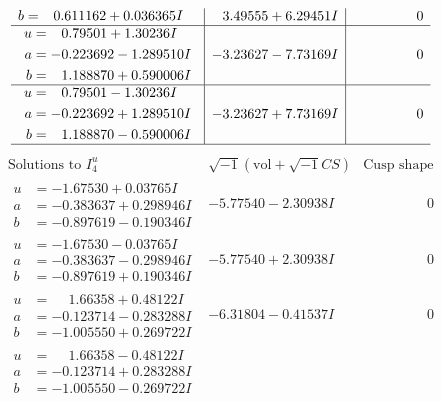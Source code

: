 \documentclass[1p]{elsarticle_modified}
\theoremstyle{definition}
\newcommand{\I}{\sqrt{-1}}
\begin{document}
$$\begin{array}{c|c|c}
\begin{aligned}
b &= \phantom{-}0.611162 + 0.036365 I\end{aligned}
 & \phantom{-}3.49555 + 6.29451 I & \phantom{-0.000000 } 0 \\ \hline\begin{aligned}
u &= \phantom{-}0.79501 + 1.30236 I \\
a &= -0.223692 - 1.289510 I \\
b &= \phantom{-}1.188870 + 0.590006 I\end{aligned}
 & -3.23627 - 7.73169 I & \phantom{-0.000000 } 0 \\ \hline\begin{aligned}
u &= \phantom{-}0.79501 - 1.30236 I \\
a &= -0.223692 + 1.289510 I \\
b &= \phantom{-}1.188870 - 0.590006 I\end{aligned}
 & -3.23627 + 7.73169 I & \phantom{-0.000000 } 0\\
 \hline 
 \end{array}$$\newpage$$\begin{array}{c|c|c}  
\text{Solutions to }I^u_{4}& \I (\text{vol} + \sqrt{-1}CS) & \text{Cusp shape}\\
 \hline 
\begin{aligned}
u &= -1.67530 + 0.03765 I \\
a &= -0.383637 + 0.298946 I \\
b &= -0.897619 - 0.190346 I\end{aligned}
 & -5.77540 - 2.30938 I & \phantom{-0.000000 } 0 \\ \hline\begin{aligned}
u &= -1.67530 - 0.03765 I \\
a &= -0.383637 - 0.298946 I \\
b &= -0.897619 + 0.190346 I\end{aligned}
 & -5.77540 + 2.30938 I & \phantom{-0.000000 } 0 \\ \hline\begin{aligned}
u &= \phantom{-}1.66358 + 0.48122 I \\
a &= -0.123714 - 0.283288 I \\
b &= -1.005550 + 0.269722 I\end{aligned}
 & -6.31804 - 0.41537 I & \phantom{-0.000000 } 0 \\ \hline\begin{aligned}
u &= \phantom{-}1.66358 - 0.48122 I \\
a &= -0.123714 + 0.283288 I \\
b &= -1.005550 - 0.269722 I\end{aligned}

\end{array}$$
\end{document}
